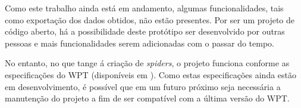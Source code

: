Como este trabalho ainda está em andamento, algumas funcionalidades, tais como exportação dos dados obtidos, não estão presentes. Por ser um projeto de código aberto, há a possibilidade deste protótipo ser desenvolvido por outras pessoas e mais funcionalidades serem adicionadas com o passar do tempo.

No entanto, no que tange á criação de \emph{spiders}, o projeto funciona conforme as especificações do WPT (disponíveis em \cite{wpt}). Como estas especificações ainda estão em desenvolvimento, é possível que em um futuro próximo seja necessária a manutenção do projeto a fim de ser compatível com a última versão do WPT.